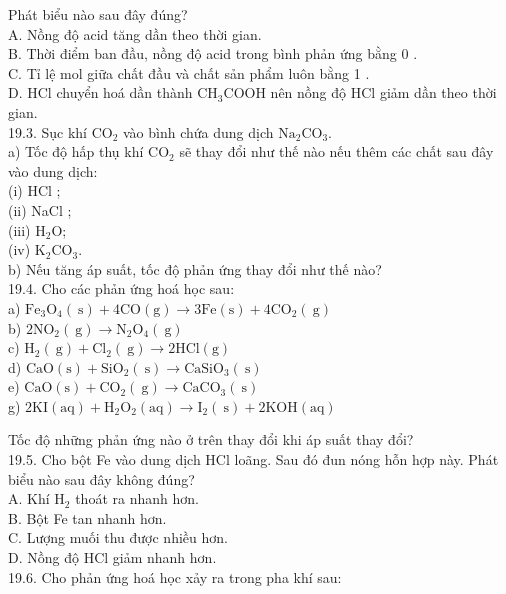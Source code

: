 \documentclass[10pt]{article}
\begin{document}
Phát biểu nào sau đây đúng?\\
A. Nồng độ acid tăng dần theo thời gian.\\
B. Thời điểm ban đầu, nồng độ acid trong bình phản ứng bằng 0 .\\
C. Tỉ lệ mol giữa chất đầu và chất sản phẩm luôn bằng 1 .\\
D. HCl chuyển hoá dần thành $\mathrm{CH}_{3} \mathrm{COOH}$ nên nồng độ HCl giảm dần theo thời gian.\\
19.3. Sục khí $\mathrm{CO}_{2}$ vào bình chứa dung dịch $\mathrm{Na}_{2} \mathrm{CO}_{3}$.\\
a) Tốc độ hấp thụ khí $\mathrm{CO}_{2}$ sẽ thay đổi như thế nào nếu thêm các chất sau đây vào dung dịch:\\
(i) HCl ;\\
(ii) NaCl ;\\
(iii) $\mathrm{H}_{2} \mathrm{O}$;\\
(iv) $\mathrm{K}_{2} \mathrm{CO}_{3}$.\\
b) Nếu tăng áp suất, tốc độ phản ứng thay đổi như thế nào?\\
19.4. Cho các phản ứng hoá học sau:\\
a) $\mathrm{Fe}_{3} \mathrm{O}_{4}(\mathrm{~s})+4 \mathrm{CO}(\mathrm{g}) \rightarrow 3 \mathrm{Fe}(\mathrm{s})+4 \mathrm{CO}_{2}(\mathrm{~g})$\\
b) $2 \mathrm{NO}_{2}(\mathrm{~g}) \rightarrow \mathrm{N}_{2} \mathrm{O}_{4}(\mathrm{~g})$\\
c) $\mathrm{H}_{2}(\mathrm{~g})+\mathrm{Cl}_{2}(\mathrm{~g}) \rightarrow 2 \mathrm{HCl}(\mathrm{g})$\\
d) $\mathrm{CaO}(\mathrm{s})+\mathrm{SiO}_{2}(\mathrm{~s}) \rightarrow \mathrm{CaSiO}_{3}(\mathrm{~s})$\\
e) $\mathrm{CaO}(\mathrm{s})+\mathrm{CO}_{2}(\mathrm{~g}) \rightarrow \mathrm{CaCO}_{3}(\mathrm{~s})$\\
g) $2 \mathrm{KI}(\mathrm{aq})+\mathrm{H}_{2} \mathrm{O}_{2}(\mathrm{aq}) \rightarrow \mathrm{I}_{2}(\mathrm{~s})+2 \mathrm{KOH}(\mathrm{aq})$

Tốc độ những phản ứng nào ở trên thay đổi khi áp suất thay đổi?\\
19.5. Cho bột Fe vào dung dịch HCl loãng. Sau đó đun nóng hỗn hợp này. Phát biểu nào sau đây không đúng?\\
A. Khí $\mathrm{H}_{2}$ thoát ra nhanh hơn.\\
B. Bột Fe tan nhanh hơn.\\
C. Lượng muối thu được nhiều hơn.\\
D. Nồng độ HCl giảm nhanh hơn.\\
19.6. Cho phản ứng hoá học xảy ra trong pha khí sau:
\end{document}
